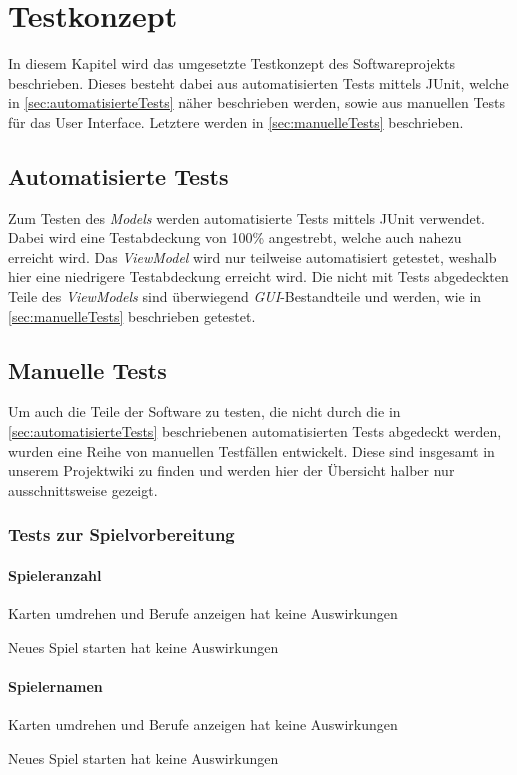 \chapter{Testkonzept}
In diesem Kapitel wird das umgesetzte Testkonzept des Softwareprojekts beschrieben. Dieses besteht dabei aus automatisierten Tests mittels JUnit, welche in \autoref{sec:automatisierteTests} näher beschrieben werden, sowie aus manuellen Tests für das User Interface. Letztere werden in \autoref{sec:manuelleTests} beschrieben.

\section{Automatisierte Tests}
\label{sec:automatisierteTests}
Zum Testen des \emph{Models} werden automatisierte Tests mittels JUnit verwendet. Dabei wird eine Testabdeckung von 100\% angestrebt, welche auch nahezu erreicht wird. Das \emph{ViewModel} wird nur teilweise automatisiert getestet, weshalb hier eine niedrigere Testabdeckung erreicht wird. Die nicht mit Tests abgedeckten Teile des \emph{ViewModels} sind überwiegend \emph{GUI}-Bestandteile und werden, wie in \autoref{sec:manuelleTests} beschrieben getestet.
\section{Manuelle Tests}
\label{sec:manuelleTests}
Um auch die Teile der Software zu testen, die nicht durch die in \autoref{sec:automatisierteTests} beschriebenen automatisierten Tests abgedeckt werden, wurden eine Reihe von manuellen Testfällen entwickelt. Diese sind insgesamt in unserem Projektwiki zu finden und werden hier der Übersicht halber nur ausschnittsweise gezeigt.
	\subsection{Tests zur Spielvorbereitung}
		\subsubsection{Spieleranzahl}
			\begin{packed_itemize}
				\item[\(\square\)] Karten umdrehen und Berufe anzeigen hat keine Auswirkungen
				\item[\(\square\)] Neues Spiel starten hat keine Auswirkungen
			\end{packed_itemize}
		\subsubsection{Spielernamen}
			\begin{packed_itemize}
				\item[\(\square\)] Karten umdrehen und Berufe anzeigen hat keine Auswirkungen
				\item[\(\square\)] Neues Spiel starten hat keine Auswirkungen
			\end{packed_itemize}
